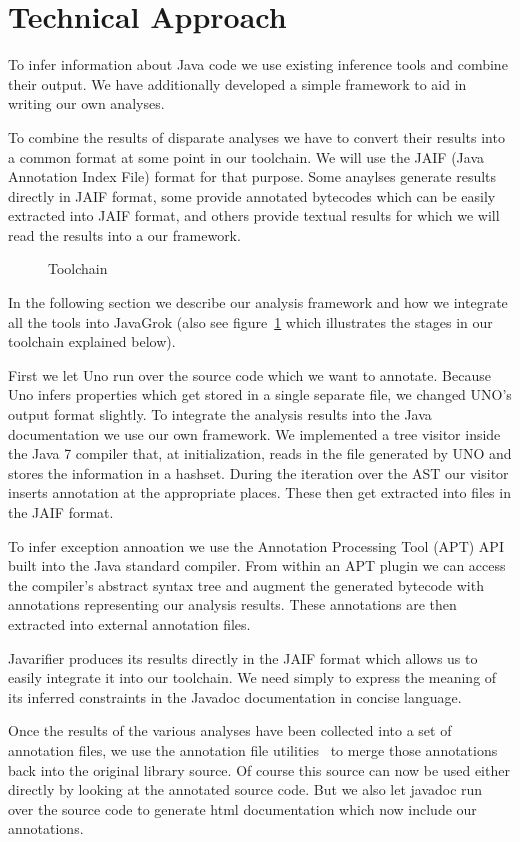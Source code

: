 \section{Technical Approach}
To infer information about Java code we use existing inference tools and
combine their output. We have additionally developed a simple framework to aid
in writing our own analyses.

To combine the results of disparate analyses we have to convert their results
into a common format at some point in our toolchain.  We will use the JAIF
(Java Annotation Index File) format for that purpose.  Some anaylses generate
results directly in JAIF format, some provide annotated bytecodes which can be
easily extracted into JAIF format, and others provide textual results for which
we will read the results into a our framework.

\begin{figure}
\centering
{}
\caption{Toolchain}
\label{fig:toolchain}
\end{figure}

In the following section we describe our analysis framework and how we
integrate all the tools into JavaGrok (also see figure~\ref{fig:toolchain} 
which illustrates the stages in our toolchain explained below).

First we let Uno run over the source code which we want to annotate. 
Because Uno infers properties which get stored in a single separate file, 
we changed UNO's output format slightly. 
To integrate the analysis results into the Java documentation we
use our own framework. We implemented a tree visitor inside the Java 7 
compiler that, at initialization, reads in the file generated by UNO and 
stores the information in a hashset. During the iteration over the AST
our visitor inserts annotation at the appropriate places. These then
get extracted into files in the JAIF format.

To infer exception annoation we use the Annotation Processing Tool (APT)
API~\cite{apt} built into the Java standard compiler.  From within an APT plugin
we can access the compiler's abstract syntax tree and augment the generated
bytecode with annotations representing our analysis results. These annotations
are then extracted into external annotation files.

Javarifier produces its results directly in the JAIF format which allows us to
easily integrate it into our toolchain. We need simply to express the meaning
of its inferred constraints in the Javadoc documentation in concise language.

Once the results of the various analyses have been collected into a set of
annotation files, we use the annotation file utilities~\cite{AFU} to merge
those annotations back into the original library source. Of course this source
can now be used either directly by looking at the annotated source code. But
we also let javadoc run over the source code to generate html documentation
which now include our annotations.